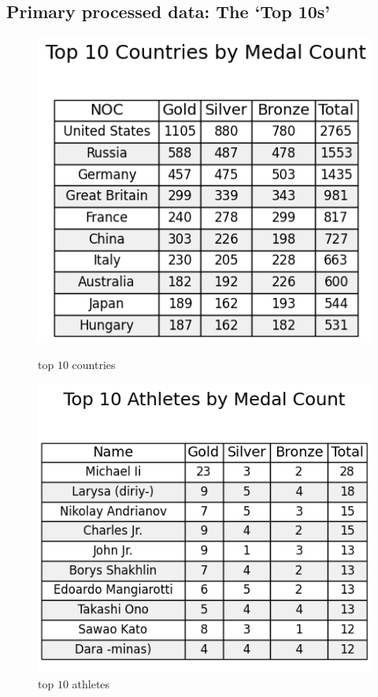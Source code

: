 \subsection{Primary processed data: The `Top 10s'}

\begin{figure}[h]
    \centering
    \begin{minipage}{0.5\textwidth}
        \centering
        \includegraphics[width=\textwidth]{../figures/top_10_countries.png}
        \caption{top $10$ countries}
        \label{fig:top_10_countries}
    \end{minipage}\hfill
    \begin{minipage}{0.5\textwidth}
        \centering
        \includegraphics[width=\textwidth]{../figures/top_10_athletes.png}
        \caption{top $10$ athletes}
        \label{fig:top_10_athletes}
    \end{minipage}
\end{figure}
